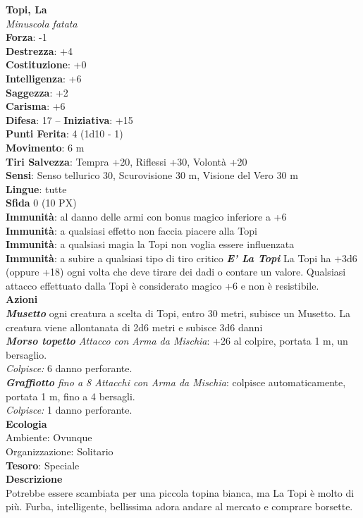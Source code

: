 \begin{multicols}{2}
	\medskip\textbf{Topi, La}\\
	\textit{Minuscola fatata}\\
	\textbf{Forza}: -1\\
	\textbf{Destrezza}: +4\\
	\textbf{Costituzione}: +0\\
	\textbf{Intelligenza}: +6\\
	\textbf{Saggezza}: +2\\
	\textbf{Carisma}: +6\\
	\textbf{Difesa}: 17 -- \textbf{Iniziativa}: +15\\
	\textbf{Punti Ferita}: 4 (1d10 - 1)\\
	\textbf{Movimento}: 6 m\\
	\textbf{Tiri Salvezza}: Tempra +20, Riflessi +30, Volontà +20 \\
	\textbf{Sensi}: Senso tellurico 30, Scurovisione 30 m, Visione del Vero 30 m\\
	\textbf{Lingue}: tutte\\
	\textbf{Sfida} 0 (10 PX)\\
	\textbf{Immunità}: al danno delle armi con bonus magico inferiore a +6\\
	\textbf{Immunità}: a qualsiasi effetto non faccia piacere alla Topi\\
	\textbf{Immunità}: a qualsiasi magia la Topi non voglia essere influenzata\\
	\textbf{Immunità}: a subire a qualsiasi tipo di tiro critico
	\textit{\textbf{E' La Topi}} La Topi ha +3d6 (oppure +18) ogni volta che deve tirare dei dadi o contare un valore.
	Qualsiasi attacco effettuato dalla Topi è considerato magico +6 e non è resistibile.\\
	\smallskip\textbf{Azioni}\\
	\textit{\textbf{Musetto}} ogni creatura a scelta di Topi, entro 30 metri, subisce un Musetto. La creatura viene allontanata di 2d6 metri e subisce 3d6 danni\\
	\textit{\textbf{Morso topetto} Attacco con Arma da Mischia}: +26 al colpire, portata 1 m, un bersaglio.\\
	\textit{Colpisce:} 6 danno perforante.\\
	\textit{\textbf{Graffiotto} fino a 8 Attacchi con Arma da Mischia}: colpisce automaticamente, portata 1 m, fino a 4 bersagli.\\
	\textit{Colpisce:} 1 danno perforante.\\
	\textbf{Ecologia}\\
	Ambiente: Ovunque\\
	Organizzazione: Solitario\\
	\textbf{Tesoro}: Speciale\\
	\textbf{Descrizione}\\
	Potrebbe essere scambiata per una piccola topina bianca, ma La Topi è molto di più. Furba, intelligente, bellissima adora andare al mercato e comprare borsette.



\end{multicols}

